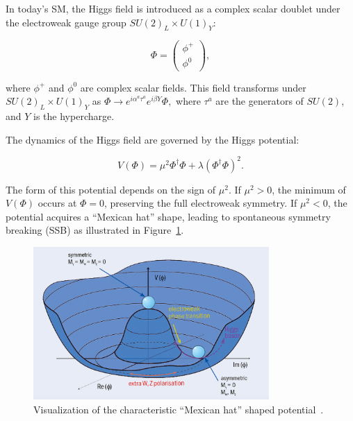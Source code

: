 


In today's SM, the Higgs field is introduced as a complex scalar doublet under the electroweak gauge group \( SU(2)_L \times U(1)_Y \):

\begin{equation}
\label{eq:higgscalar}
    \Phi = \begin{pmatrix} \phi^+ \\ \phi^0 \end{pmatrix},
\end{equation}

where \( \phi^+ \) and \( \phi^0 \) are complex scalar fields. This field transforms under \( SU(2)_L \times U(1)_Y \) as \(\Phi \to e^{i\alpha^a \tau^a} e^{i\beta Y} \Phi,\) where \( \tau^a \) are the generators of \( SU(2) \), and \( Y \) is the hypercharge.

The dynamics of the Higgs field are governed by the Higgs potential:

\begin{equation}
\label{eq:higgpot}
V(\Phi) = \mu^2 \Phi^\dagger \Phi + \lambda (\Phi^\dagger \Phi)^2.
\end{equation}

The form of this potential depends on the sign of \( \mu^2 \). If \( \mu^2 > 0 \), the minimum of \( V(\Phi) \) occurs at \( \Phi = 0 \), preserving the full electroweak symmetry. If \( \mu^2 < 0 \), the potential acquires a ``Mexican hat'' shape, leading to spontaneous symmetry breaking (SSB) as illustrated in Figure~\ref{fig:mexicanhat}.

\begin{figure}[h!]
  \centering
  \includegraphics[width=0.8\textwidth,clip] {figures/CERNliftinglid.jpg}
  \caption{Visualization of the characteristic ``Mexican hat'' shaped potential~\cite{Thethril79:online}.}
  \label{fig:mexicanhat}
\end{figure}

